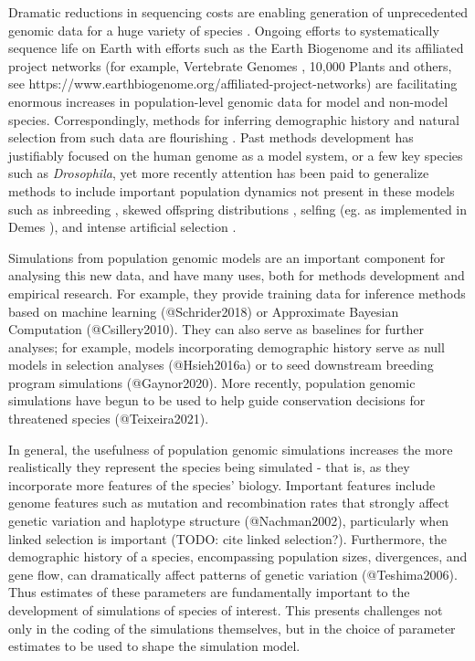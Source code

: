 \documentclass[hidelinks]{article}
\begin{document}
Dramatic reductions in sequencing costs are enabling generation of
unprecedented genomic data for a huge variety of species
\citep{Ellegren2014}. Ongoing efforts to systematically sequence life on
Earth with efforts such as the Earth Biogenome \citep{Lewin2022} and its
affiliated project networks (for example, Vertebrate Genomes
\citep{Rhie2021}, 10,000 Plants \citep{Cheng2018} and others, see
https://www.earthbiogenome.org/affiliated-project-networks) are
facilitating enormous increases in population-level genomic data for
model and non-model species. Correspondingly, methods for inferring
demographic history and natural selection from such data are flourishing
\citep{Beichman2018}. Past methods development has justifiably focused on the
human genome as a model system, or a few key species such as
\emph{Drosophila}, yet more recently attention has been paid to
generalize methods to include important population dynamics not present
in these models such as inbreeding \citep{Blischak2020}, skewed offspring
distributions \citep{Montano2016}, selfing (eg. as implemented in Demes
\citep{Gower2022}), and intense artificial selection \citep{MacLeod2013,
MacLeod2014}.

Simulations from population genomic models are an important component
for analysing this new data, and have many uses, both for methods
development and empirical research. For example, they provide training
data for inference methods based on machine learning (@Schrider2018) or
Approximate Bayesian Computation (@Csillery2010). They can also serve as
baselines for further analyses; for example, models incorporating
demographic history serve as null models in selection analyses
(@Hsieh2016a) or to seed downstream breeding program simulations
(@Gaynor2020). More recently, population genomic simulations have begun
to be used to help guide conservation decisions for threatened species
(@Teixeira2021).

In general, the usefulness of population genomic simulations increases
the more realistically they represent the species being simulated - that
is, as they incorporate more features of the species' biology. Important
features include genome features such as mutation and recombination
rates that strongly affect genetic variation and haplotype structure
(@Nachman2002), particularly when linked selection is important (TODO:
cite linked selection?). Furthermore, the demographic history of a
species, encompassing population sizes, divergences, and gene flow, can
dramatically affect patterns of genetic variation (@Teshima2006). Thus
estimates of these parameters are fundamentally important to the
development of simulations of species of interest. This presents
challenges not only in the coding of the simulations themselves, but in
the choice of parameter estimates to be used to shape the simulation
model.
\end{document}
